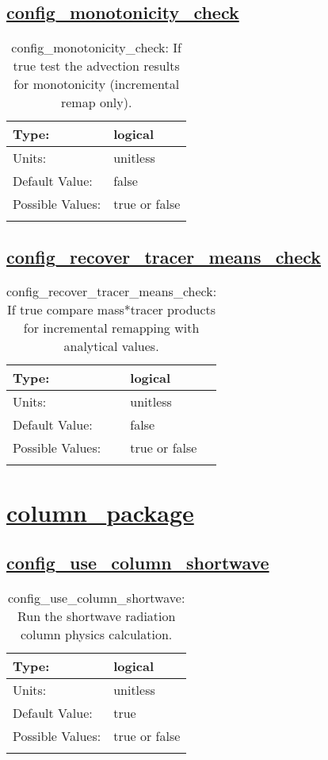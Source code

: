\subsection[config\_monotonicity\_check]{\hyperref[sec:nm_tab_advection]{config\_monotonicity\_check}}
\label{subsec:nm_sec_config_monotonicity_check}
\begin{center}
\begin{longtable}{| p{2.0in} || p{4.0in} |}
    \hline
    Type: & logical \\
    \hline
    Units: & \si{unitless} \\
    \hline
    Default Value: & false \\
    \hline
    Possible Values: & true or false \\
    \hline
    \caption{config\_monotonicity\_check: If true test the advection results for monotonicity (incremental remap only).}
\end{longtable}
\end{center}
\subsection[config\_recover\_tracer\_means\_check]{\hyperref[sec:nm_tab_advection]{config\_recover\_tracer\_means\_check}}
\label{subsec:nm_sec_config_recover_tracer_means_check}
\begin{center}
\begin{longtable}{| p{2.0in} || p{4.0in} |}
    \hline
    Type: & logical \\
    \hline
    Units: & \si{unitless} \\
    \hline
    Default Value: & false \\
    \hline
    Possible Values: & true or false \\
    \hline
    \caption{config\_recover\_tracer\_means\_check: If true compare mass*tracer products for incremental remapping with analytical values.}
\end{longtable}
\end{center}
\section[column\_package]{\hyperref[sec:nm_tab_column_package]{column\_package}}
\label{sec:nm_sec_column_package}
\subsection[config\_use\_column\_shortwave]{\hyperref[sec:nm_tab_column_package]{config\_use\_column\_shortwave}}
\label{subsec:nm_sec_config_use_column_shortwave}
\begin{center}
\begin{longtable}{| p{2.0in} || p{4.0in} |}
    \hline
    Type: & logical \\
    \hline
    Units: & \si{unitless} \\
    \hline
    Default Value: & true \\
    \hline
    Possible Values: & true or false \\
    \hline
    \caption{config\_use\_column\_shortwave: Run the shortwave radiation column physics calculation.}
\end{longtable}
\end{center}
